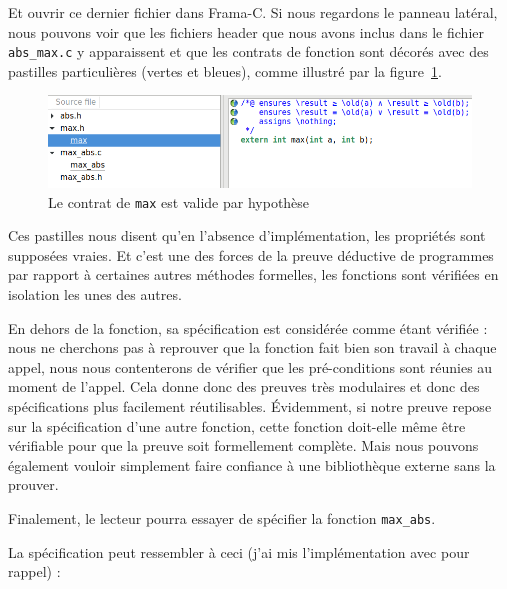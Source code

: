\documentclass[12pt,francais,]{scrbook}
\begin{document}
Et ouvrir ce dernier fichier dans Frama-C. Si nous regardons le panneau
latéral, nous pouvons voir que les fichiers header que nous avons inclus
dans le fichier \texttt{abs\_max.c} y apparaissent et que les contrats
de fonction sont décorés avec des pastilles particulières (vertes et
bleues), comme illustré par la figure~\ref{fig:2-4-max_abs}.

\begin{figure}[htbp]
\centering
\includegraphics[scale=0.5]{2-4-max_abs.png}
\caption{Le contrat de \texttt{max} est valide par hypothèse}
\label{fig:2-4-max_abs}
\end{figure}

Ces pastilles nous disent qu'en l'absence d'implémentation, les
propriétés sont supposées vraies. Et c'est une des forces de la preuve
déductive de programmes par rapport à certaines autres méthodes
formelles, les fonctions sont vérifiées en isolation les unes des
autres.

En dehors de la fonction, sa spécification est considérée comme étant
vérifiée : nous ne cherchons pas à reprouver que la fonction fait bien
son travail à chaque appel, nous nous contenterons de vérifier que les
pré-conditions sont réunies au moment de l'appel. Cela donne donc des
preuves très modulaires et donc des spécifications plus facilement
réutilisables. Évidemment, si notre preuve repose sur la spécification
d'une autre fonction, cette fonction doit-elle même être vérifiable pour
que la preuve soit formellement complète. Mais nous pouvons également
vouloir simplement faire confiance à une bibliothèque externe sans la
prouver.

Finalement, le lecteur pourra essayer de spécifier la fonction
\texttt{max\_abs}.

La spécification peut ressembler à ceci (j'ai mis l'implémentation avec
pour rappel) :
\end{document}
